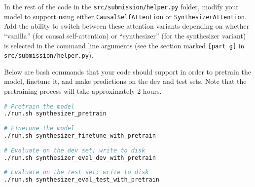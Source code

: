 \begin{enumerate}[(a)]
In the rest of the code in the \texttt{src/submission/helper.py} folder, modify your model to support using either \texttt{CausalSelfAttention} or \texttt{SynthesizerAttention}. Add the ability to switch between these attention variants depending on whether ``vanilla'' (for causal self-attention) or ``synthesizer'' (for the synthesizer variant) is selected in the command line arguments (see the section marked \texttt{[part g]} in \texttt{src/submission/helper.py}). 

Below are bash commands that your code should support in order to pretrain the model, finetune it, and make predictions on the dev and test sets.
Note that the pretraining process will take approximately 2 hours.
\begin{lstlisting}[language=bash]
# Pretrain the model
./run.sh synthesizer_pretrain
        
# Finetune the model
./run.sh synthesizer_finetune_with_pretrain
        
# Evaluate on the dev set; write to disk
./run.sh synthesizer_eval_dev_with_pretrain
        
# Evaluate on the test set; write to disk
./run.sh synthesizer_eval_test_with_pretrain
\end{lstlisting}



    

\end{enumerate}

